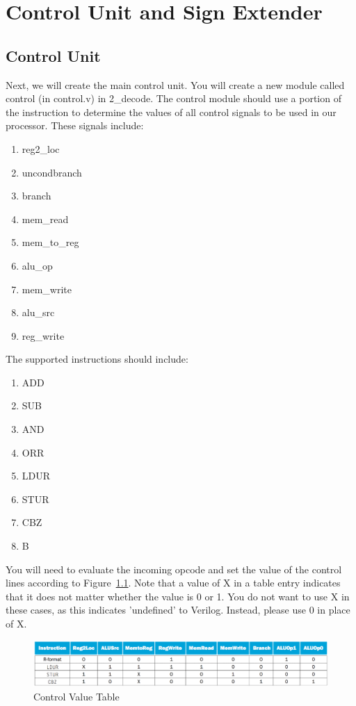 \chapter{Control Unit and Sign Extender}

\section{Control Unit}
Next, we will create the main control unit.  You will create a new module called control (in control.v) in 2\_decode.  The control module should use a portion of the instruction to determine the values of all control signals to be used in our processor.  These signals include:
\begin{enumerate}
\item reg2\_loc
\item uncondbranch
\item branch
\item mem\_read
\item mem\_to\_reg
\item alu\_op
\item mem\_write
\item alu\_src
\item reg\_write
\end{enumerate}

The supported instructions should include:
\begin{enumerate}
	\item ADD
	\item SUB
	\item AND
	\item ORR
	\item LDUR
	\item STUR
	\item CBZ
	\item B
\end{enumerate}

You will need to evaluate the incoming opcode and set the value of the control lines according to Figure~\ref{fig:control_value_table}.  Note that a value of X in a table entry indicates that it does not matter whether the value is 0 or 1.  You do not want to use X in these cases, as this indicates 'undefined' to Verilog.  Instead, please use 0 in place of X.

\begin{figure}
	\caption{Control Value Table}\label{fig:control_value_table}
	\begin{center}
		\includegraphics[width=4.75in]{../images/control_value_table.png}
	\end{center}
\end{figure} 

